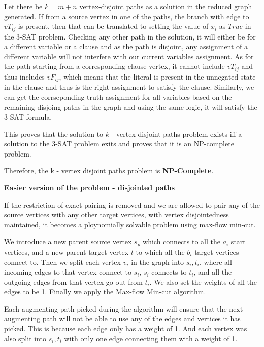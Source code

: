 \documentclass{imports}
\begin{document}
    Let there be $k = m+n$ vertex-disjoint paths as a solution in the reduced graph generated. If from a source vertex in one of the paths, the branch with edge to $vT_{ij}$ is present, then that can be translated to setting the value of $x_i$ as $True$ in the 3-SAT problem. Checking any other path in the solution, it will either be for a different variable or a clause and as the path is disjoint, any assignment of a different variable will not interfere with our current variables assignment. As for the path starting from a corresponding clause vertex, it cannot include $vT_{ij}$ and thus includes $vF_{ij}$, which means that the literal is present in the unnegated state in the clause and thus is the right assignment to satisfy the clause. Similarly, we can get the corrseponding truth assignment for all variables based on the remaining disjoing paths in the graph and using the same logic, it will satisfy the 3-SAT formula. \vspace{10pt}
 
    This proves that the solution to $k$ - vertex disjoint paths problem exists iff a solution to the 3-SAT problem exits and proves that it is an NP-complete problem. \vspace{10pt}

    Therefore, the k - vertex disjoint paths problem is \textbf{NP-Complete}. \vspace{10pt}


    \textbf{Easier version of the problem - disjointed paths} \vspace{10pt}

    If the restriction of exact pairing is removed and we are allowed to pair any of the source vertices with any other target vertices,
    with vertex disjointedness maintained, it becomes a ploynomially solvable problem using max-flow min-cut. \vspace{10pt}

    We introduce a new parent source vertex $s_p$ which connects to all the $a_i$ start vertices, and a new parent target vertex $t$ 
    to which all the $b_i$ target vertices connect to. Then we split each vertex $v_i$ in the graph into $s_i, t_i$, where all incoming edges
    to that vertex connect to $s_i$, $s_i$ connects to $t_i$, and all the outgoing edges from that vertex go out from $t_i$.
    We also set the weights of all the edges to be 1. Finally we apply the Max-flow Min-cut algorithm. \vspace{10pt}
    
    Each augmenting path picked during the algorithm will ensure that the next augmenting path will not be able to use any of the edges and 
    vertices it has picked. This is because each edge only has a weight of 1. And each vertex was also split into $s_i, t_i$ with only one edge connecting
    them with a weight of 1. \vspace{10pt}
    
\end{document}
